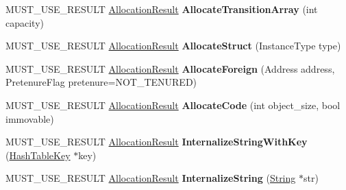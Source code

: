 \begin{DoxyCompactItemize}
\item 
M\+U\+S\+T\+\_\+\+U\+S\+E\+\_\+\+R\+E\+S\+U\+LT \hyperlink{classv8_1_1internal_1_1_allocation_result}{Allocation\+Result} {\bfseries Allocate\+Transition\+Array} (int capacity)\hypertarget{classv8_1_1internal_1_1_heap_ab73e7f52ed010f3a60ccd0e8cf270b71}{}\label{classv8_1_1internal_1_1_heap_ab73e7f52ed010f3a60ccd0e8cf270b71}

\item 
M\+U\+S\+T\+\_\+\+U\+S\+E\+\_\+\+R\+E\+S\+U\+LT \hyperlink{classv8_1_1internal_1_1_allocation_result}{Allocation\+Result} {\bfseries Allocate\+Struct} (Instance\+Type type)\hypertarget{classv8_1_1internal_1_1_heap_ac461a6c9610ff15bfb5289882e7c3d4e}{}\label{classv8_1_1internal_1_1_heap_ac461a6c9610ff15bfb5289882e7c3d4e}

\item 
M\+U\+S\+T\+\_\+\+U\+S\+E\+\_\+\+R\+E\+S\+U\+LT \hyperlink{classv8_1_1internal_1_1_allocation_result}{Allocation\+Result} {\bfseries Allocate\+Foreign} (Address address, Pretenure\+Flag pretenure=N\+O\+T\+\_\+\+T\+E\+N\+U\+R\+ED)\hypertarget{classv8_1_1internal_1_1_heap_a29fc9bd11ee5bfd0f5fad4fbe1024577}{}\label{classv8_1_1internal_1_1_heap_a29fc9bd11ee5bfd0f5fad4fbe1024577}

\item 
M\+U\+S\+T\+\_\+\+U\+S\+E\+\_\+\+R\+E\+S\+U\+LT \hyperlink{classv8_1_1internal_1_1_allocation_result}{Allocation\+Result} {\bfseries Allocate\+Code} (int object\+\_\+size, bool immovable)\hypertarget{classv8_1_1internal_1_1_heap_a410d3f3eacc9695674b8e98bc9b0c8d0}{}\label{classv8_1_1internal_1_1_heap_a410d3f3eacc9695674b8e98bc9b0c8d0}

\item 
M\+U\+S\+T\+\_\+\+U\+S\+E\+\_\+\+R\+E\+S\+U\+LT \hyperlink{classv8_1_1internal_1_1_allocation_result}{Allocation\+Result} {\bfseries Internalize\+String\+With\+Key} (\hyperlink{classv8_1_1internal_1_1_hash_table_key}{Hash\+Table\+Key} $\ast$key)\hypertarget{classv8_1_1internal_1_1_heap_a20004a332b23cf7d79bb9f28d389b1fd}{}\label{classv8_1_1internal_1_1_heap_a20004a332b23cf7d79bb9f28d389b1fd}

\item 
M\+U\+S\+T\+\_\+\+U\+S\+E\+\_\+\+R\+E\+S\+U\+LT \hyperlink{classv8_1_1internal_1_1_allocation_result}{Allocation\+Result} {\bfseries Internalize\+String} (\hyperlink{classv8_1_1internal_1_1_string}{String} $\ast$str)\hypertarget{classv8_1_1internal_1_1_heap_a84f2fc9c36f170aa2986c3b9df4fd41d}{}\label{classv8_1_1internal_1_1_heap_a84f2fc9c36f170aa2986c3b9df4fd41d}


\end{DoxyCompactItemize}
